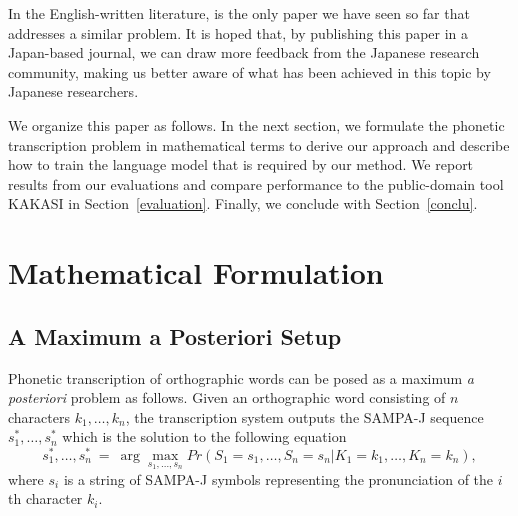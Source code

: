 In the English-written literature, \cite{PSKA} is the only paper
we have seen so far that addresses a similar problem. It is hoped
that, by publishing this paper in a Japan-based journal, we can
draw more feedback from the Japanese research community, making us
better aware of what has been achieved in this topic by Japanese
researchers.

We organize this paper as follows. In the next section, we
formulate the phonetic transcription problem in mathematical terms
to derive our approach and describe how to train the language
model that is required by our method. We report results from our
evaluations and compare performance to the public-domain tool
KAKASI \cite{KAKASI} in Section~\ref{evaluation}. Finally, we
conclude with Section~\ref{conclu}.


\section{Mathematical Formulation}
\label{formulation}

\subsection{A Maximum a Posteriori Setup}
Phonetic transcription of orthographic words can be posed as a
maximum {\it a posteriori} problem as follows. Given an
orthographic word consisting of $n$ characters $k_1,\ldots,k_n$,
the transcription system outputs the SAMPA-J sequence
$s_1^\ast,\ldots,s_n^\ast$ which is the solution to the following
equation
\begin{displaymath}
s_1^\ast,\ldots,s_n^\ast \ = \ \arg\max_{s_1,\ldots,s_n}
Pr(S_1=s_1,\dots,S_n=s_n|K_1=k_1,\ldots,K_n=k_n),
\end{displaymath}
where $s_i$ is a string of SAMPA-J symbols representing the
pronunciation of the $i$th character $k_i$.

